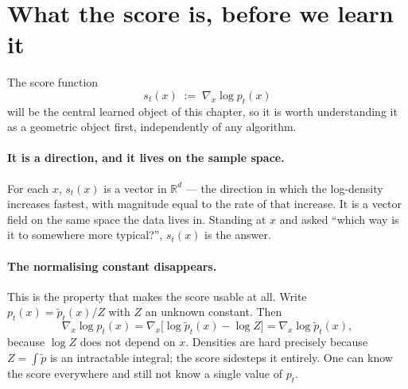 \documentclass[11pt,a4paper]{report}
\theoremstyle{definition}
\theoremstyle{remark}
\newcommand{\RR}{\mathbb R}
\begin{document}
\section{What the score is, before we learn it}
\label{sec:score-intuition}

The score function
\begin{equation}
\label{eq:score-def-intuition}
s_t(x) \;:=\; \nabla_x\log p_t(x)
\end{equation}
will be the central learned object of this chapter, so it is worth
understanding it as a geometric object first, independently of any algorithm.

\paragraph{It is a direction, and it lives on the sample space.} For each
$x$, $s_t(x)$ is a vector in $\RR^d$ --- the direction in which the
log-density increases fastest, with magnitude equal to the rate of that
increase. It is a vector field on the same space the data lives in. Standing
at $x$ and asked ``which way is it to somewhere more typical?'', $s_t(x)$ is
the answer.

\paragraph{The normalising constant disappears.} This is the property that
makes the score usable at all. Write $p_t(x)=\tilde p_t(x)/Z$ with $Z$ an
unknown constant. Then
\begin{equation}
\nabla_x\log p_t(x) = \nabla_x\bigl[\log\tilde p_t(x)-\log Z\bigr]
= \nabla_x\log\tilde p_t(x),
\end{equation}
because $\log Z$ does not depend on $x$. Densities are hard precisely
because $Z=\int\tilde p$ is an intractable integral; the score sidesteps it
entirely. One can know the score everywhere and still not know a single
value of $p_t$.
\end{document}
